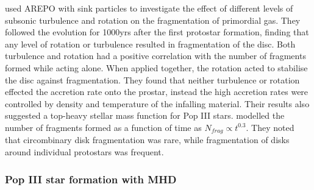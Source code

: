 \documentclass[11pt]{article}
\begin{document}
\cite{Wollenberg2019} used AREPO with sink particles to investigate the effect of different levels of subsonic turbulence and rotation on the fragmentation of primordial gas. They followed the evolution for 1000yrs after the first protostar formation, finding that any level of rotation or turbulence resulted in fragmentation of the disc. Both turbulence and rotation had a positive correlation with the number of fragments formed while acting alone. When applied together, the rotation acted to stabilise the disc against fragmentation. They found that neither turbulence or rotation effected the accretion rate onto the prostar, instead the high accretion rates were controlled by density and temperature of the infalling material. Their results also suggested a top-heavy stellar mass function for Pop III stars.
\cite{Susa2019} modelled the number of fragments formed as a function of time as $N_{frag} \propto t^{0.3}$. They noted that circombinary disk fragmentation was rare, while fragmentation of disks around individual protostars was frequent.




\subsubsection{Pop III star formation with MHD}
\label{sub:MHD_popIII}
\end{document}

